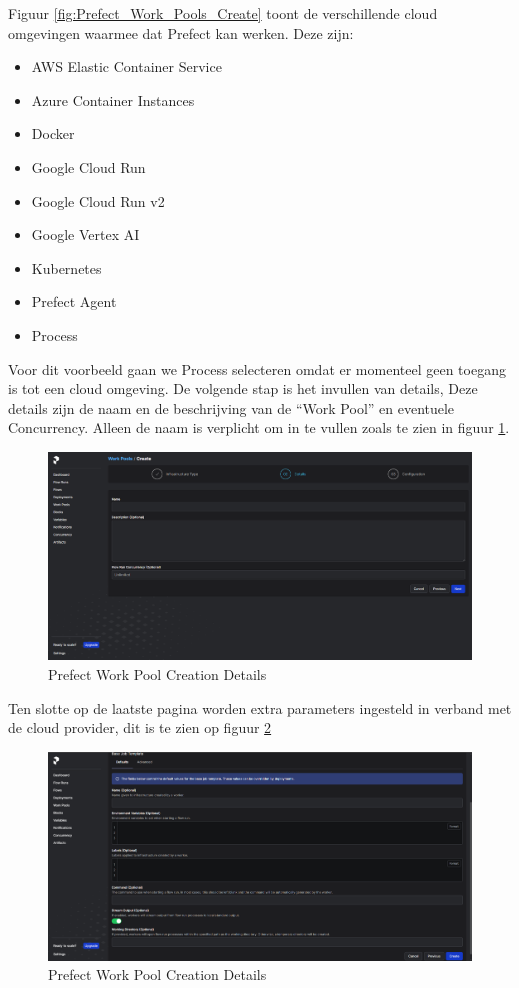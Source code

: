 Figuur \ref{fig:Prefect_Work_Pools_Create} toont de verschillende cloud omgevingen waarmee dat Prefect kan werken. Deze zijn:
\begin{itemize}
    \item AWS Elastic Container Service
    \item Azure Container Instances
    \item Docker
    \item Google Cloud Run
    \item Google Cloud Run v2
    \item Google Vertex AI
    \item Kubernetes
    \item Prefect Agent 
    \item Process
\end{itemize}
Voor dit voorbeeld gaan we Process selecteren omdat er momenteel geen toegang is tot een cloud omgeving.
De volgende stap is het invullen van details, Deze details zijn de naam en de beschrijving van de ``Work Pool'' en eventuele Concurrency. Alleen de naam is verplicht om in te vullen zoals te zien in figuur \ref{fig:Prefect_Work_Pools_Create_Details}.
\begin{figure}[h]
    \includegraphics[width=\linewidth]{graphics/Prefect_Work_Pools_Create_Details.PNG}
    \caption{Prefect Work Pool Creation Details}
    \label{fig:Prefect_Work_Pools_Create_Details}
\end{figure}
Ten slotte op de laatste pagina worden extra parameters ingesteld in verband met de cloud provider, dit is te zien op figuur \ref{fig:Prefect_Work_Pools_Create_parameters}
\begin{figure}[h]
    \includegraphics[width=\linewidth]{graphics/Prefect_Work_Pools_Create_Parameters.PNG}
    \caption{Prefect Work Pool Creation Details}
    \label{fig:Prefect_Work_Pools_Create_parameters}
\end{figure}
